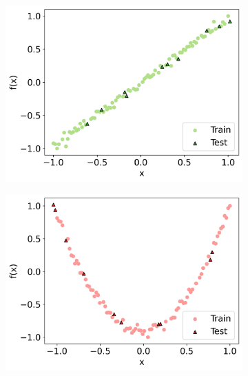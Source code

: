 \documentclass[journal=jacsat,manuscript=article]{achemso}
\begin{document}
\begin{figure}[H]
	\centering
	\begin{subfigure}[b]{0.3\textwidth}
		\centering
		\includegraphics[width=\textwidth]{../images/Function_Fitting/function_dataset/linear_train_vs_test.png}
		\caption{}
		\label{fig:linear_train_vs_test}
	\end{subfigure}
	\hfill
	\begin{subfigure}[b]{0.3\textwidth}
		\centering
		\includegraphics[width=\textwidth]{../images/Function_Fitting/function_dataset/quadratic_train_vs_test.png}
		\caption{}
		\label{fig:quadratic_train_vs_test}
	\end{subfigure}
	\hfill
	\begin{subfigure}[b]{0.3\textwidth}

\end{subfigure}
\end{figure}
\end{document}
